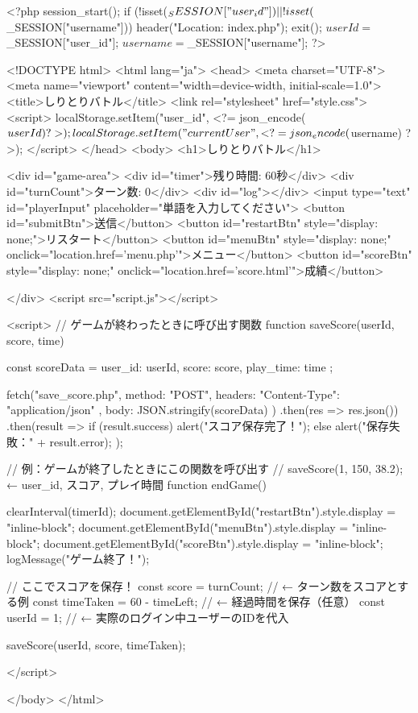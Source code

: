 <?php
session_start();
if (!isset($_SESSION["user_id"]) || !isset($_SESSION["username"])) {
  header("Location: index.php");
  exit();
}
$userId = $_SESSION["user_id"];
$username = $_SESSION["username"];
?>

<!DOCTYPE html>
<html lang="ja">
<head>
  <meta charset="UTF-8">
  <meta name="viewport" content="width=device-width, initial-scale=1.0">
  <title>しりとりバトル</title>
  <link rel="stylesheet" href="style.css">
  <script>
  localStorage.setItem("user_id", <?= json_encode($userId) ?>);
  localStorage.setItem("currentUser", <?= json_encode($username) ?>);
</script>
</head>
<body>
  <h1>しりとりバトル</h1>

  <div id="game-area">
    <div id="timer">残り時間: 60秒</div>
    <div id="turnCount">ターン数: 0</div>
    <div id="log"></div>
    <input type="text" id="playerInput" placeholder="単語を入力してください">
    <button id="submitBtn">送信</button>
    <button id="restartBtn" style="display: none;">リスタート</button>
    <button id="menuBtn" style="display: none;" onclick="location.href='menu.php'">メニュー</button>
    <button id="scoreBtn" style="display: none;" onclick="location.href='score.html'">成績</button>

  </div>
  <script src="script.js"></script>

  <script>
  // ゲームが終わったときに呼び出す関数
  function saveScore(userId, score, time) {
    const scoreData = {
      user_id: userId,
      score: score,
      play_time: time
    };

    fetch("save_score.php", {
      method: "POST",
      headers: { "Content-Type": "application/json" },
      body: JSON.stringify(scoreData)
    })
    .then(res => res.json())
    .then(result => {
      if (result.success) {
        alert("スコア保存完了！");
      } else {
        alert("保存失敗：" + result.error);
      }
    });
  }

  // 例：ゲームが終了したときにこの関数を呼び出す
  // saveScore(1, 150, 38.2); ← user_id, スコア, プレイ時間
  function endGame() {
  clearInterval(timerId);
  document.getElementById("restartBtn").style.display = "inline-block";
  document.getElementById("menuBtn").style.display = "inline-block";
  document.getElementById("scoreBtn").style.display = "inline-block";
  logMessage("ゲーム終了！");

  // ここでスコアを保存！
  const score = turnCount;        // ← ターン数をスコアとする例
  const timeTaken = 60 - timeLeft; // ← 経過時間を保存（任意）
  const userId = 1;               // ← 実際のログイン中ユーザーのIDを代入

  saveScore(userId, score, timeTaken);
}

</script>

</body>
</html>
